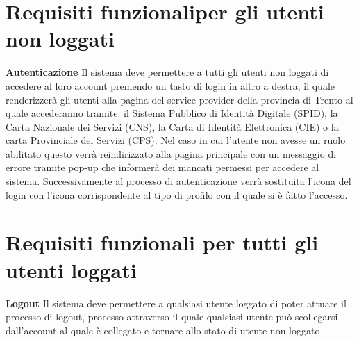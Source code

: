     \section{Requisiti funzionaliper gli utenti non loggati}
        \begin{rfList}
            \rfItem \textbf{Autenticazione} Il sistema deve permettere a tutti gli utenti non loggati di accedere al loro account premendo un tasto di login in altro a destra, il quale renderizzerà gli utenti alla pagina del service provider della provincia di Trento al quale accederanno tramite: il Sistema Pubblico di Identità Digitale (SPID), la Carta Nazionale dei Servizi (CNS), la Carta di Identità Elettronica (CIE) o la carta Provinciale dei Servizi (CPS). Nel caso in cui l'utente non avesse un ruolo abilitato questo verrà reindirizzato alla pagina principale con un messaggio di errore tramite pop-up che informerà dei mancati permessi per accedere al sistema. Successivamente al processo di autenticazione verrà sostituita l'icona del login con l'icona corrispondente al tipo di profilo con il quale si è fatto l'accesso.
        \end{rfList}
    \section{Requisiti funzionali per tutti gli utenti loggati}
        \begin{rfList}
            \rfItem \textbf{Logout} Il sistema deve permettere a qualsiasi utente loggato di poter attuare il processo di logout, processo attraverso il quale qualsiasi utente può scollegarsi dall'account al quale è collegato e tornare allo stato di utente non loggato
        \end{rfList}     
